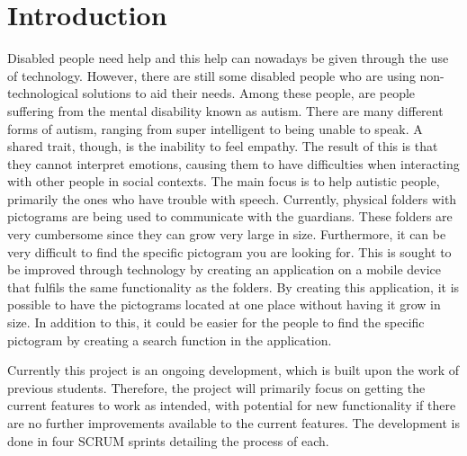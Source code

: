 \chapter{Introduction}

Disabled people need help and this help can nowadays be given through the use of technology.
However, there are still some disabled people who are using non-technological solutions to aid their needs.
Among these people, are people suffering from the mental disability known as autism.
There are many different forms of autism, ranging from super intelligent to being unable to speak.
A shared trait, though, is the inability to feel empathy.
The result of this is that they cannot interpret emotions, causing them to have difficulties when interacting with other people in social contexts.
The main focus is to help autistic people, primarily the ones who have trouble with speech.
Currently, physical folders with pictograms are being used to communicate with the guardians.
These folders are very cumbersome since they can grow very large in size.
Furthermore, it can be very difficult to find the specific pictogram you are looking for.
This is sought to be improved through technology by creating an application on a mobile device that fulfils the same functionality as the folders.
By creating this application, it is possible to have the pictograms located at one place without having it grow in size.
In addition to this, it could be easier for the people to find the specific pictogram by creating a search function in the application.

Currently this project is an ongoing development, which is built upon the work of previous students.
Therefore, the project will primarily focus on getting the current features to work as intended, with potential for new functionality if there are no further improvements available to the current features.
The development is done in four SCRUM sprints detailing the process of each.